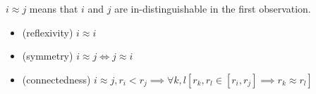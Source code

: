 $i \approx j$ means that $i$ and $j$ are in-distinguishable in the first observation.
   
   
\begin{itemize}
 \item (reflexivity) $i \approx i$
  \item(symmetry) $i \approx j \iff j \approx i$
  \item(connectedness) $i \approx j , r_i < r_j \implies \forall k, l [r_k, r_l \in [r_i, r_j] \implies r_k \approx r_l ]$
\end{itemize}
